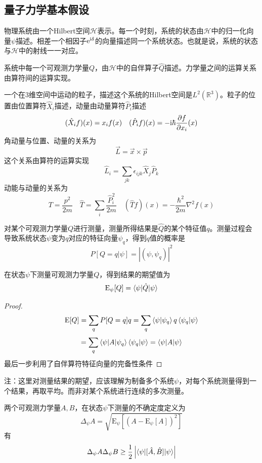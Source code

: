 \subsection{量子力学基本假设}

\begin{postulate}[量子态假设]
    物理系统由一个Hilbert空间$\mathcal{H}$表示。每一个时刻，系统的状态由$\mathcal{H}$中的归一化向量$\psi$描述。相差一个相因子$\mathrm{e}^{\mathrm{i}\delta}$的向量描述同一个系统状态。也就是说，系统的状态与$\mathcal{H}$中的射线一一对应。
\end{postulate}
\begin{postulate}[算符假设]
    系统中每一个可观测力学量$Q$，由$\mathcal{H}$中的自伴算子$\hat{Q}$描述。力学量之间的运算关系由算符间的运算实现。
\end{postulate}
\begin{example}
    一个在3维空间中运动的粒子，描述这个系统的Hilbert空间是$L^2(\mathbb{R}^3)$。粒子的位置由位置算符$\hat{X}_i$描述，动量由动量算符$\hat{P}_i$描述
    $$(\hat{X}_if)(x)=x_if(x)\quad (\hat{P}_if)(x)=-\mathrm{i}\hbar\dfrac{\partial f}{\partial x_i}(x)$$
    角动量与位置、动量的关系为
    $$\vec{L}=\vec{x}\times \vec{p}$$
    这个关系由算符的运算实现
    $$\hat{L}_i=\sum_{jk}\epsilon_{ijk}\hat{X}_j\hat{P}_k$$
    动能与动量的关系为
    $$T=\frac{p^2}{2m}\quad \hat{T}=\sum_i\frac{\hat{P}_i^2}{2m}\quad (\hat{T}f)(x)=-\frac{\hbar^2}{2m}\nabla^2 f(x)$$
\end{example}
\begin{postulate}[测量假设]
    对某个可观测力学量$Q$进行测量，测量所得结果是$\hat{Q}$的某个特征值$q$。测量过程会导致系统状态$\psi$变为$q$对应的特征向量$\psi_q$，得到$q$值的概率是
    $$P\left[Q=q|\psi\right]=|(\psi,\psi_q)|^2$$
\end{postulate}
\begin{theorem}
    在状态$\psi$下测量可观测力学量$Q$，得到结果的期望值为
    $$\mathrm{E}_\psi[Q]=\braket{\psi|\hat{Q}|\psi}$$
\end{theorem}
\begin{proof}
    $$\mathrm{E}[Q]=\sum_qP[Q=q]q=\sum_q \braket{\psi|\psi_q}q\braket{\psi_q|\psi}$$
    $$=\sum_q\braket{\psi|A|\psi_q}\braket{\psi_q|\psi}=\braket{\psi|A|\psi}$$
    最后一步利用了自伴算符特征向量的完备性条件
\end{proof}
注：这里对测量结果的期望，应该理解为制备多个系统$\psi$，对每个系统测量得到一个结果，再取平均。而非对某个系统进行连续的多次测量。
\begin{theorem}[不确定关系]
    两个可观测力学量$A,B$，在状态$\psi$下测量的不确定度定义为
    $$\Delta_\psi A=\sqrt{\mathrm{E}_\psi\left[(A-\mathrm{E}_\psi[A])^2\right]}$$
    有
    $$\Delta_\psi A\Delta_\psi B\geq\frac{1}{2}\left|\braket{\psi|[\hat{A},\hat{B}]|\psi}\right|$$
\end{theorem}
